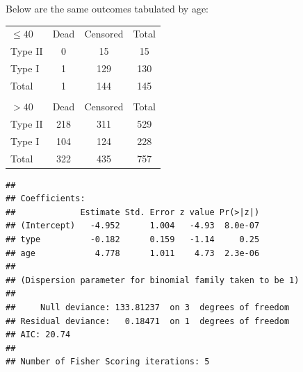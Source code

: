 \documentclass[10pt]{beamer}\usepackage[]{graphicx}\usepackage[]{color}
\makeatletter
\newenvironment{kframe}{%
 \def\at@end@of@kframe{}%
 \ifinner\ifhmode%
  \def\at@end@of@kframe{\end{minipage}}%
  \begin{minipage}{\columnwidth}%
 \fi\fi%
 \def\FrameCommand##1{\hskip\@totalleftmargin \hskip-\fboxsep
 \colorbox{shadecolor}{##1}\hskip-\fboxsep
     \hskip-\linewidth \hskip-\@totalleftmargin \hskip\columnwidth}%
 \MakeFramed {\advance\hsize-\width
   \@totalleftmargin\z@ \linewidth\hsize
   \@setminipage}}%
 {\par\unskip\endMakeFramed%
 \at@end@of@kframe}
\newenvironment{knitrout}{}{} %
\makeatother
\begin{document}
\begin{frame}
	\vspace{-.81in}
\tiny
Below are the same outcomes tabulated by age:

\begin{table}[h]
	\begin{tabular}{lcc|c}
		$\leq 40$ & Dead &  Censored & Total\\
		Type II & 0 & 15 & 15 \\
		Type I & 1 & 129 & 130 \\
		\hline
		Total & 1 & 144 & 145 \\
		& & & \\
		$> 40$ & Dead &  Censored & Total\\
		Type II & 218 & 311 & 529 \\
		Type I & 104 & 124 & 228 \\
		\hline
		Total & 322 & 435 & 757 \\ 
	\end{tabular}
\end{table}

	\vspace{-.21in}
\begin{knitrout}\tiny
{}\color{fgcolor}\begin{kframe}
\begin{verbatim}
## 
## Coefficients:
##             Estimate Std. Error z value Pr(>|z|)
## (Intercept)   -4.952      1.004   -4.93  8.0e-07
## type          -0.182      0.159   -1.14     0.25
## age            4.778      1.011    4.73  2.3e-06
## 
## (Dispersion parameter for binomial family taken to be 1)
## 
##     Null deviance: 133.81237  on 3  degrees of freedom
## Residual deviance:   0.18471  on 1  degrees of freedom
## AIC: 20.74
## 
## Number of Fisher Scoring iterations: 5
\end{verbatim}
\end{kframe}
\end{knitrout}
\end{frame}
\end{document}
